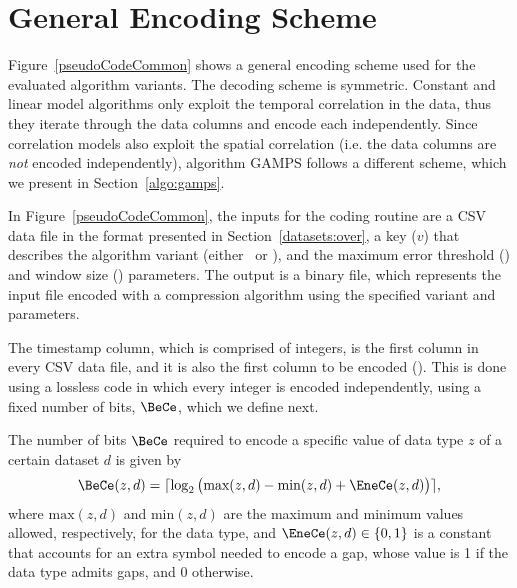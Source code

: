 

\vspace{-20pt}
\section{General Encoding Scheme}
\label{algo:details}


\vspace{-5pt}
Figure~\ref{pseudoCodeCommon} shows a general encoding scheme used for the evaluated algorithm variants. The decoding scheme is symmetric. Constant and linear model algorithms only exploit the temporal correlation in the data, thus they iterate through the data columns and encode each independently. Since correlation models also exploit the spatial correlation (i.e. the data columns are \textit{not} encoded independently), algorithm GAMPS follows a different scheme, which we present in Section~\ref{algo:gamps}.





In Figure~\ref{pseudoCodeCommon}, the inputs for the coding routine are a CSV data file in the format presented in Section~\ref{datasets:over}, a key ($v$) that describes the algorithm variant (either \maskalgo\ or \NOmaskalgo), and the maximum error threshold (\maxerror) and window size (\win) parameters. The output is a binary file, which represents the input file encoded with a compression algorithm using the specified variant and parameters.


\clearpage


The timestamp column, which is comprised of integers, is the first column in every CSV data file, and it is also the first column to be encoded (). This is done using a lossless code in which every integer is encoded independently, using a fixed number of bits, $\BeCe$, which we define next.


\begin{defcion}
The number of bits $\BeCe$ required to encode a specific value of data type $z$ of a certain dataset $d$ is given by
\vspace{-5pt}
\begin{equation}
\label{eq:bece}
\BeCe(z, d) = \lceil{ \log_2 \big( \text{max}(z, d) - \text{min}(z, d) + \EneCe(z, d) \big) } \rceil,
\end{equation}
where $\text{max}(z, d)$ and $\text{min}(z, d)$ are the maximum and minimum values allowed, respectively, for the data type, and $\EneCe(z, d)\in \{0,1\}$ is a constant that accounts for an extra symbol needed to encode a gap, whose value is 1 if the data type admits gaps, and 0 otherwise.
\end{defcion}


